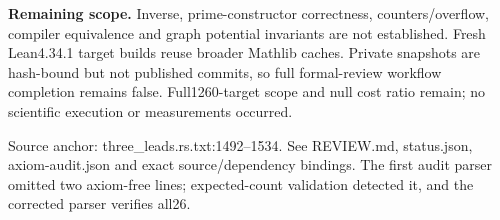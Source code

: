 \documentclass[11pt]{article}\usepackage[margin=0.8in]{geometry}\usepackage[T1]{fontenc}\usepackage{lmodern,tikz,hyperref}\setlength{\parindent}{0pt}\setlength{\parskip}{8pt}\sloppy
\begin{document}
\textbf{Remaining scope.} Inverse, prime-constructor correctness, counters/overflow, compiler equivalence and graph potential invariants are not established. Fresh Lean4.34.1 target builds reuse broader Mathlib caches. Private snapshots are hash-bound but not published commits, so full formal-review workflow completion remains false. Full1260-target scope and null cost ratio remain; no scientific execution or measurements occurred.

Source anchor: three\_leads.rs.txt:1492--1534. See REVIEW.md, status.json, axiom-audit.json and exact source/dependency bindings. The first audit parser omitted two axiom-free lines; expected-count validation detected it, and the corrected parser verifies all26.
\end{document}

